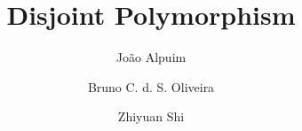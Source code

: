 \documentclass[9pt]{llncs}
\begin{document}

\title{Disjoint Polymorphism}

\author{João Alpuim \and Bruno C. d. S. Oliveira \and Zhiyuan Shi}


\maketitle

\begin{abstract}
  
\end{abstract}










\newpage



\clearpage
\onecolumn

%
%
\end{document}
